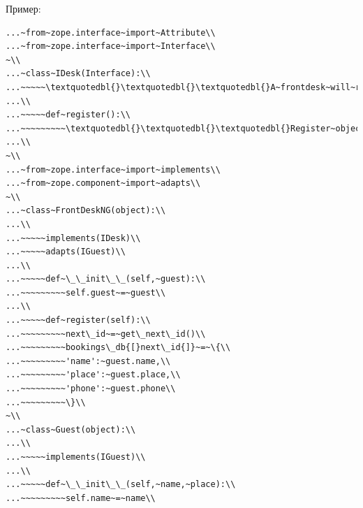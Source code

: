 \documentclass[a4paper,openany,twoside,draft]{book}
\begin{document}
Пример:

\begin{verbatim}
...~from~zope.interface~import~Attribute\\
...~from~zope.interface~import~Interface\\
~\\
...~class~IDesk(Interface):\\
...~~~~~\textquotedbl{}\textquotedbl{}\textquotedbl{}A~frontdesk~will~register~object's~details\textquotedbl{}\textquotedbl{}\textquotedbl{}\\
...\\
...~~~~~def~register():\\
...~~~~~~~~~\textquotedbl{}\textquotedbl{}\textquotedbl{}Register~object's~details\textquotedbl{}\textquotedbl{}\textquotedbl{}\\
...\\
~\\
...~from~zope.interface~import~implements\\
...~from~zope.component~import~adapts\\
~\\
...~class~FrontDeskNG(object):\\
...\\
...~~~~~implements(IDesk)\\
...~~~~~adapts(IGuest)\\
...\\
...~~~~~def~\_\_init\_\_(self,~guest):\\
...~~~~~~~~~self.guest~=~guest\\
...\\
...~~~~~def~register(self):\\
...~~~~~~~~~next\_id~=~get\_next\_id()\\
...~~~~~~~~~bookings\_db{[}next\_id{]}~=~\{\\
...~~~~~~~~~'name':~guest.name,\\
...~~~~~~~~~'place':~guest.place,\\
...~~~~~~~~~'phone':~guest.phone\\
...~~~~~~~~~\}\\
~\\
...~class~Guest(object):\\
...\\
...~~~~~implements(IGuest)\\
...\\
...~~~~~def~\_\_init\_\_(self,~name,~place):\\
...~~~~~~~~~self.name~=~name\\

\end{verbatim}
\end{document}
